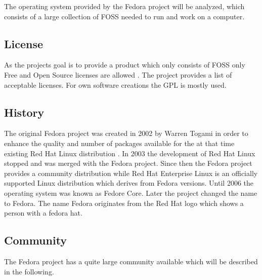 The operating system provided by the Fedora project will be analyzed, which
consists of a large collection of \ac{FOSS} needed to run and work on a
computer.

\subsection{License}

As the projects goal is to provide a product which only consists of \ac{FOSS}
only Free and Open Source licenses are allowed \cite{FedoraLicensing}. The
project provides a list of acceptable licenses. For own software creations the
\ac{GPL} is mostly used.

\subsection{History}

The original Fedora project was created in 2002 by Warren Togami in order to
enhance the quality and number of packages available for the at that time
existing Red Hat Linux distribution
\cite{FedoraAbout,FedoraTogami,FedoraHistoricalSchedules}. In 2003 the
development of Red Hat Linux stopped and was merged with the Fedora project.
Since then the Fedora project provides a community distribution while Red Hat
Enterprise Linux is an officially supported Linux distribution which derives
from Fedora versions. Until 2006 the operating system was known as Fedore Core.
Later the project changed the name to Fedora. The name Fedora originates from
the Red Hat logo which shows a person with a fedora hat.

\subsection{Community}

The Fedora project has a quite large community available which will be
described in the following.

